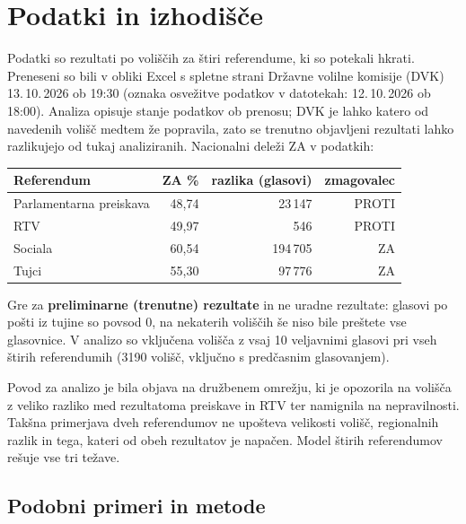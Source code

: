 \documentclass[11pt,a4paper]{article}
\begin{document}
\clearpage
\tableofcontents
\newpage

\section{Podatki in izhodišče}

Podatki so rezultati po voliščih za štiri referendume, ki so potekali hkrati. Preneseni so bili v obliki Excel s spletne strani Državne volilne komisije (DVK) 13.\,10.\,2026 ob 19:30 (oznaka osvežitve podatkov v datotekah: 12.\,10.\,2026 ob 18:00). Analiza opisuje stanje podatkov ob prenosu; DVK je lahko katero od navedenih volišč medtem že popravila, zato se trenutno objavljeni rezultati lahko razlikujejo od tukaj analiziranih. Nacionalni deleži ZA v podatkih:

\begin{center}
\begin{tabular}{lrrr}
\toprule
Referendum & ZA \% & razlika (glasovi) & zmagovalec \\
\midrule
Parlamentarna preiskava & 48,74 & 23\,147 & PROTI \\
RTV & 49,97 & 546 & PROTI \\
Sociala & 60,54 & 194\,705 & ZA \\
Tujci & 55,30 & 97\,776 & ZA \\
\bottomrule
\end{tabular}
\end{center}

Gre za \textbf{preliminarne (trenutne) rezultate} in ne uradne rezultate: glasovi po pošti iz tujine so povsod 0, na nekaterih voliščih še niso bile preštete vse glasovnice. V analizo so vključena volišča z vsaj 10 veljavnimi glasovi pri vseh štirih referendumih (3190 volišč, vključno s predčasnim glasovanjem).

Povod za analizo je bila objava na družbenem omrežju, ki je opozorila na volišča z veliko razliko med rezultatoma preiskave in RTV ter namignila na nepravilnosti. Takšna primerjava dveh referendumov ne upošteva velikosti volišč, regionalnih razlik in tega, kateri od obeh rezultatov je napačen. Model štirih referendumov rešuje vse tri težave.

\subsection{Podobni primeri in metode}
\end{document}
